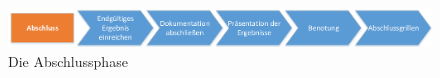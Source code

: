 \begin{figure}[h]
\centering
\includegraphics[width=1\linewidth]{Bilder/ProjektAbschluss}
\caption{Die Abschlussphase}
\label{fig:ProjektAbschluss}
\end{figure}


%	
%	
%	





